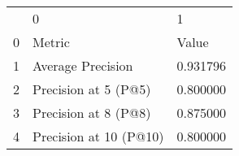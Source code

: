 \begin{tabular}{lll}
 & 0 & 1 \\
0 & Metric & Value \\
1 & Average Precision & 0.931796 \\
2 & Precision at 5 (P@5) & 0.800000 \\
3 & Precision at 8 (P@8) & 0.875000 \\
4 & Precision at 10 (P@10) & 0.800000 \\
\end{tabular}
